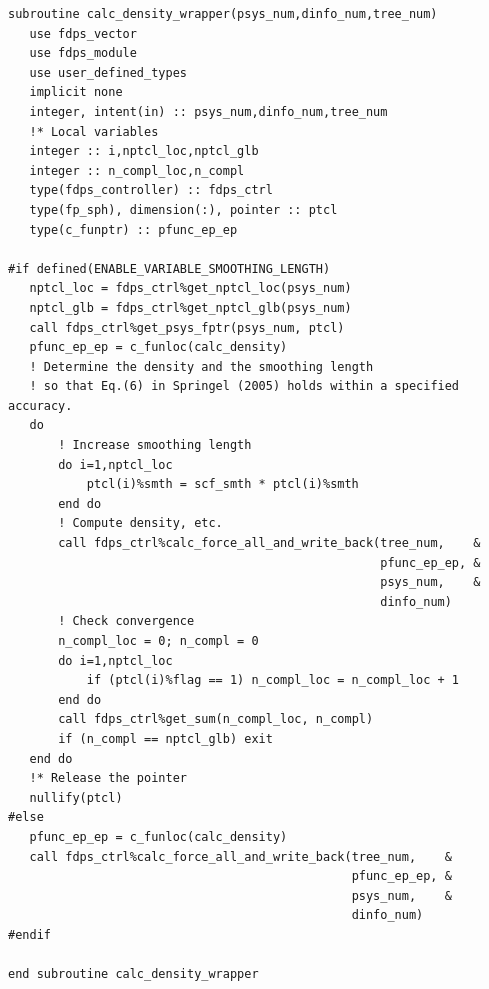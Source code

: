 \begin{lstlisting}[caption=\procedure \texttt{calc\_density\_wrapper}の実装]
subroutine calc_density_wrapper(psys_num,dinfo_num,tree_num)
   use fdps_vector
   use fdps_module
   use user_defined_types
   implicit none
   integer, intent(in) :: psys_num,dinfo_num,tree_num
   !* Local variables
   integer :: i,nptcl_loc,nptcl_glb
   integer :: n_compl_loc,n_compl
   type(fdps_controller) :: fdps_ctrl
   type(fp_sph), dimension(:), pointer :: ptcl
   type(c_funptr) :: pfunc_ep_ep

#if defined(ENABLE_VARIABLE_SMOOTHING_LENGTH)
   nptcl_loc = fdps_ctrl%get_nptcl_loc(psys_num)
   nptcl_glb = fdps_ctrl%get_nptcl_glb(psys_num)
   call fdps_ctrl%get_psys_fptr(psys_num, ptcl)
   pfunc_ep_ep = c_funloc(calc_density)
   ! Determine the density and the smoothing length
   ! so that Eq.(6) in Springel (2005) holds within a specified accuracy.
   do
       ! Increase smoothing length 
       do i=1,nptcl_loc
           ptcl(i)%smth = scf_smth * ptcl(i)%smth
       end do
       ! Compute density, etc.
       call fdps_ctrl%calc_force_all_and_write_back(tree_num,    &
                                                    pfunc_ep_ep, &
                                                    psys_num,    &
                                                    dinfo_num)
       ! Check convergence
       n_compl_loc = 0; n_compl = 0
       do i=1,nptcl_loc
           if (ptcl(i)%flag == 1) n_compl_loc = n_compl_loc + 1
       end do
       call fdps_ctrl%get_sum(n_compl_loc, n_compl)
       if (n_compl == nptcl_glb) exit
   end do
   !* Release the pointer
   nullify(ptcl)
#else
   pfunc_ep_ep = c_funloc(calc_density)
   call fdps_ctrl%calc_force_all_and_write_back(tree_num,    &
                                                pfunc_ep_ep, &
                                                psys_num,    &
                                                dinfo_num)
#endif

end subroutine calc_density_wrapper
\end{lstlisting}
\endifFtn
\ifC %
